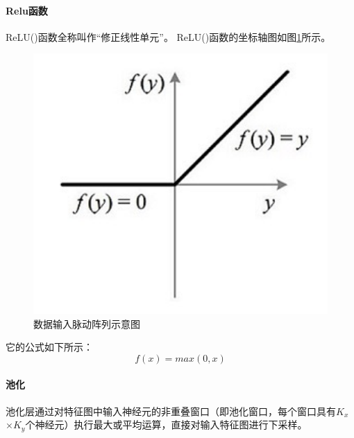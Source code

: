 \paragraph{Relu函数}
ReLU()函数全称叫作“修正线性单元”。
ReLU()函数的坐标轴图如图\ref{fig:relu}所示。
\begin{figure}[htbp]
    \centering
    \includegraphics[width=12cm]{figures/ReLU.png}
    \caption{数据输入脉动阵列示意图}
    \label{fig:relu}
\end{figure}
它的公式如下所示：
$$
    f(x) = max(0,x)
$$


\paragraph{池化}
池化层通过对特征图中输入神经元的非重叠窗口（即池化窗口，每个窗口具有$K_x$×$K_y$个神经元）执行最大或平均运算，直接对输入特征图进行下采样。




